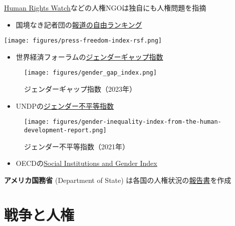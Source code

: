 \documentclass[
  xelatex,
  ja=standard]{bxjsarticle}
\providecommand{\tightlist}{%
  \setlength{\itemsep}{0pt}\setlength{\parskip}{0pt}}\usepackage{longtable,booktabs,array}
\begin{document}
\href{https://www.hrw.org/ja/asia/japan}{Human Rights
Watch}などの人権NGOは独自にも人権問題を指摘

\begin{itemize}
\tightlist
\item
  国境なき記者団の\href{https://rsf.org/en/ranking}{報道の自由ランキング}
\end{itemize}

\texttt{[image: figures/press-freedom-index-rsf.png]}

\begin{itemize}
\tightlist
\item
  世界経済フォーラムの\href{https://jp.weforum.org/reports/global-gender-gap-report-2023}{ジェンダーギャップ指数}
\end{itemize}

\begin{figure}[htpb]

{\centering \texttt{[image: figures/gender\_gap\_index.png]}

}

\caption{ジェンダーギャップ指数（2023年）}

\end{figure}

\begin{itemize}
\tightlist
\item
  UNDPの\href{https://hdr.undp.org/data-center/thematic-composite-indices/gender-inequality-index\#/indicies/GII}{ジェンダー不平等指数}
\end{itemize}

\begin{figure}[htpb]

{\centering \texttt{[image: figures/gender-inequality-index-from-the-human-development-report.png]}

}

\caption{ジェンダー不平等指数（2021年）}

\end{figure}

\begin{itemize}
\tightlist
\item
  OECDの\href{https://www.genderindex.org/}{Social Institutions and
  Gender Index}
\end{itemize}

\textbf{アメリカ国務省} (Department of State)
は各国の人権状況の\href{https://jp.usembassy.gov/ja/category/reports-ja/}{報告書}を作成

\hypertarget{ux6226ux4e89ux3068ux4ebaux6a29}{%
\section{戦争と人権}\label{ux6226ux4e89ux3068ux4ebaux6a29}}
\end{document}

